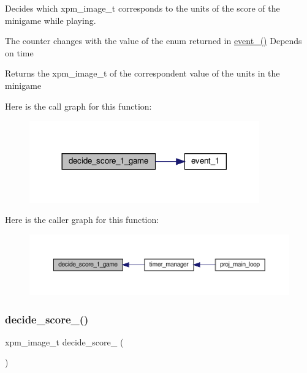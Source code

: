 Decides which xpm\+\_\+image\+\_\+t corresponds to the units of the score of the minigame while playing. 

The counter changes with the value of the enum returned in \hyperlink{group__loading__xpms_ga70f5397af0d313815b96cf662cd48f65}{event\+\_()} Depends on time

\begin{DoxyReturn}{Returns}
the xpm\+\_\+image\+\_\+t of the correspondent value of the units in the minigame 
\end{DoxyReturn}
Here is the call graph for this function\+:
\nopagebreak
\begin{figure}[H]
\begin{center}
\leavevmode
\includegraphics[width=281pt]{group__loading__xpms_ga5808a0af7a81c9213427d1173ea4bfdb_cgraph}
\end{center}
\end{figure}
Here is the caller graph for this function\+:
\nopagebreak
\begin{figure}[H]
\begin{center}
\leavevmode
\includegraphics[width=350pt]{group__loading__xpms_ga5808a0af7a81c9213427d1173ea4bfdb_icgraph}
\end{center}
\end{figure}
\mbox{\label{group__loading__xpms_ga3ff28b6df0ced24968db40bec439452e}} 
\subsubsection{\texorpdfstring{decide\+\_\+score\+\_()}{decide\_score\_2()}}
{\footnotesize\ttfamily xpm\+\_\+image\+\_\+t decide\+\_\+score\+\_ (\begin{DoxyParamCaption}{ }\end{DoxyParamCaption})}



